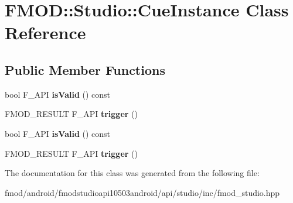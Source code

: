 \hypertarget{class_f_m_o_d_1_1_studio_1_1_cue_instance}{\section{F\+M\+O\+D\+:\+:Studio\+:\+:Cue\+Instance Class Reference}
\label{class_f_m_o_d_1_1_studio_1_1_cue_instance}
}
\subsection*{Public Member Functions}
\begin{DoxyCompactItemize}
\item 
\hypertarget{class_f_m_o_d_1_1_studio_1_1_cue_instance_a8ec3fd364d4aeaebae978b3d2ba17e92}{bool F\+\_\+\+A\+P\+I {\bfseries is\+Valid} () const }\label{class_f_m_o_d_1_1_studio_1_1_cue_instance_a8ec3fd364d4aeaebae978b3d2ba17e92}

\item 
\hypertarget{class_f_m_o_d_1_1_studio_1_1_cue_instance_a576a8c1345a826b17397362419b80575}{F\+M\+O\+D\+\_\+\+R\+E\+S\+U\+L\+T F\+\_\+\+A\+P\+I {\bfseries trigger} ()}\label{class_f_m_o_d_1_1_studio_1_1_cue_instance_a576a8c1345a826b17397362419b80575}

\item 
\hypertarget{class_f_m_o_d_1_1_studio_1_1_cue_instance_a8ec3fd364d4aeaebae978b3d2ba17e92}{bool F\+\_\+\+A\+P\+I {\bfseries is\+Valid} () const }\label{class_f_m_o_d_1_1_studio_1_1_cue_instance_a8ec3fd364d4aeaebae978b3d2ba17e92}

\item 
\hypertarget{class_f_m_o_d_1_1_studio_1_1_cue_instance_a576a8c1345a826b17397362419b80575}{F\+M\+O\+D\+\_\+\+R\+E\+S\+U\+L\+T F\+\_\+\+A\+P\+I {\bfseries trigger} ()}\label{class_f_m_o_d_1_1_studio_1_1_cue_instance_a576a8c1345a826b17397362419b80575}

\end{DoxyCompactItemize}


The documentation for this class was generated from the following file\+:\begin{DoxyCompactItemize}
\item 
fmod/android/fmodstudioapi10503android/api/studio/inc/fmod\+\_\+studio.\+hpp\end{DoxyCompactItemize}
